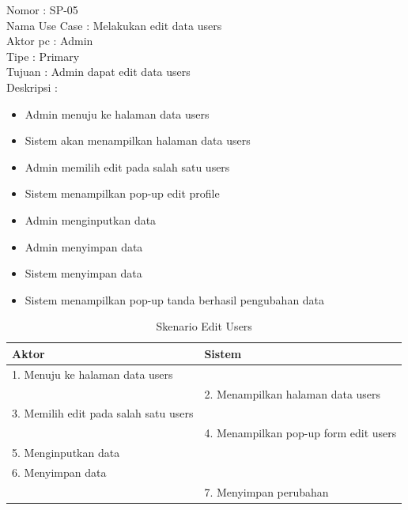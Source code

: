 \begin{enumerate}
Nomor \kern 3.6pc : SP-05 \\
Nama Use Case : Melakukan edit data users \\
Aktor  pc : Admin \\
Tipe \kern 4.6pc : Primary \\
Tujuan \kern 3.6pc : Admin dapat edit data users \\
Deskripsi \kern 2.5pc : 

\begin{itemize}
	\item Admin menuju ke halaman data users
	\item Sistem akan menampilkan halaman data users
	\item Admin memilih edit pada salah satu users
	\item Sistem menampilkan pop-up edit profile
	\item Admin menginputkan data
	\item Admin menyimpan data
	\item Sistem menyimpan data
	\item Sistem menampilkan pop-up tanda berhasil pengubahan data
	
\end{itemize}

\begin{table}
	\caption{Skenario Edit Users}
	\centering
	\begin{tabular}{ | l | p{65mm} |}
		\hline 
		\textbf{Aktor} & \textbf{Sistem} \\
		\hline
		
		1.	Menuju ke halaman data users &  \\
		
		\hline
		
		&  2.	Menampilkan halaman data users \\
		
		\hline
		
		3. Memilih edit pada salah satu users & \\
		
		\hline
		
		& 4.	Menampilkan pop-up form edit users \\
		
		\hline
		
		5.	Menginputkan data  & \\
		\hline
		
		6.	Menyimpan data & \\
		\hline
		
		& 7.	Menyimpan perubahan \\
		\hline
		

\end{tabular}
\end{table}
\end{enumerate}
